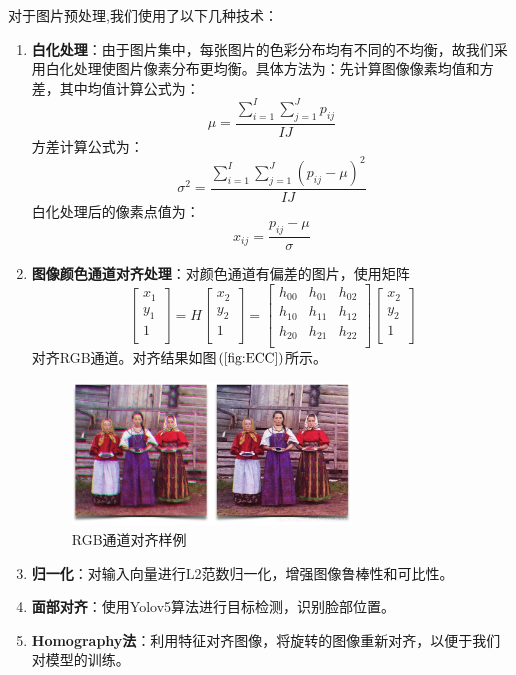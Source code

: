 \documentclass[UTF8]{ctexart}
\begin{document}
对于图片预处理,我们使用了以下几种技术：
\begin{enumerate}
  \item \textbf{白化处理}：由于图片集中，每张图片的色彩分布均有不同的不均衡，故我们采用白化处理使图片像素分布更均衡。具体方法为：先计算图像像素均值和方差，其中均值计算公式为：\[\mu =\frac{\sum_{i=1}^{I}\sum_{j=1}^{J}p_{ij}}{IJ}\]方差计算公式为：\[\sigma^2 = \frac{\sum_{i=1}^{I}\sum_{j=1}^{J}(p_{ij}-\mu)^2}{IJ}\]白化处理后的像素点值为：\[x_{ij}=\frac{p_{ij}-\mu}{\sigma}\]
  \item \textbf{图像颜色通道对齐处理}：对颜色通道有偏差的图片，使用矩阵\[
    \begin{bmatrix}
      x_1\\y_1\\1\\
    \end{bmatrix}=H
    \begin{bmatrix}
      x_2\\y_2\\1\\
    \end{bmatrix}=
    \begin{bmatrix}
      h_{00}&h_{01}&h_{02}\\
      h_{10}&h_{11}&h_{12}\\
      h_{20}&h_{21}&h_{22}\\
    \end{bmatrix}
    \begin{bmatrix}
      x_2\\y_2\\1\\
    \end{bmatrix}\]对齐RGB通道。对齐结果如图$\left(\ref{fig:ECC}\right)$所示。
    \begin{figure}[!ht]
      \centering
      \includegraphics[width=0.7\textwidth]{ECC.jpg}
      \caption{RGB通道对齐样例}
      \label{fig:ECC}
    \end{figure}
  \item \textbf{归一化}：对输入向量进行L2范数归一化，增强图像鲁棒性和可比性。
  \item \textbf{面部对齐}：使用Yolov5算法进行目标检测，识别脸部位置。
  \item \textbf{Homography法}：利用特征对齐图像，将旋转的图像重新对齐，以便于我们对模型的训练。
\end{enumerate}
\end{document}
